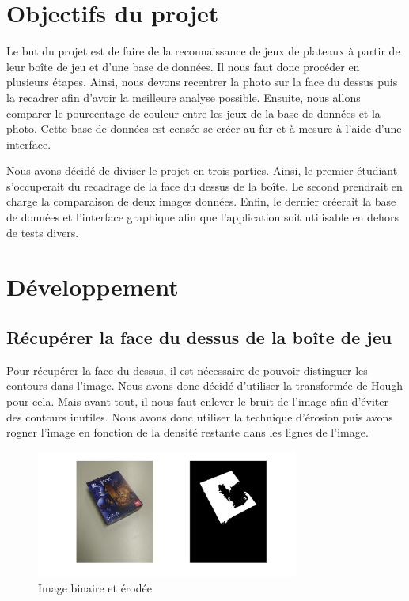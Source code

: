\documentclass{st50_template}
\begin{document}
\newcommand\VRule{\color{lightgray}\vrule width 0.5pt}

\newpage
\thispagestyle{empty}
\tableofcontents

\newpage

\section{Objectifs du projet}

Le but du projet est de faire de la reconnaissance de jeux de plateaux à partir de leur boîte de jeu et d'une base de données. Il nous faut donc procéder en plusieurs étapes. Ainsi, nous devons recentrer la photo sur la face du dessus puis la recadrer afin d'avoir la meilleure analyse possible. Ensuite, nous allons comparer le pourcentage de couleur entre les jeux de la base de données et la photo. Cette base de données est censée se créer au fur et à mesure à l'aide d'une interface.

Nous avons décidé de diviser le projet en trois parties. Ainsi, le premier étudiant s'occuperait du recadrage de la face du dessus de la boîte. Le second prendrait en charge la comparaison de deux images données. Enfin, le dernier créerait la base de données et l'interface graphique afin que l'application soit utilisable en dehors de tests divers.


\section{Développement}

\subsection{Récupérer la face du dessus de la boîte de jeu}
Pour récupérer la face du dessus, il est nécessaire de pouvoir distinguer les contours dans l'image. Nous avons donc décidé d'utiliser la transformée de Hough pour cela. Mais avant tout, il nous faut enlever le bruit de l'image afin d'éviter des contours inutiles. Nous avons donc utiliser la technique d'érosion puis avons rogner l'image en fonction de la densité restante dans les lignes de l'image.

\begin{figure}[ht]
    \centering
    \includegraphics[width=0.77\textwidth]{images/erosion.jpg}
    \caption{Image binaire et érodée}
    \label{erosion}
\end{figure}
\end{document}
